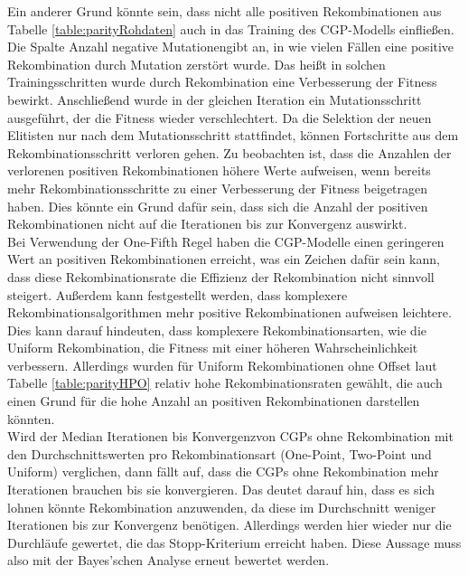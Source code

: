 Ein anderer Grund könnte sein, dass nicht alle positiven Rekombinationen aus Tabelle \ref{table:parityRohdaten} auch in das Training des CGP-Modells einfließen. 
Die Spalte \glqq Anzahl negative Mutationen\grqq\space gibt an, in wie vielen Fällen eine positive Rekombination durch Mutation zerstört wurde.
Das heißt in solchen Trainingsschritten wurde durch Rekombination eine Verbesserung der Fitness bewirkt.
Anschließend wurde in der gleichen Iteration ein Mutationsschritt ausgeführt, der die Fitness wieder verschlechtert.
Da die Selektion der neuen Elitisten nur nach dem Mutationsschritt stattfindet, können Fortschritte aus dem Rekombinationsschritt verloren gehen.
Zu beobachten ist, dass die Anzahlen der verlorenen positiven Rekombinationen höhere Werte aufweisen, wenn bereits mehr Rekombinationsschritte zu einer Verbesserung der Fitness beigetragen haben.
Dies könnte ein Grund dafür sein, dass sich die Anzahl der positiven Rekombinationen nicht auf die Iterationen bis zur Konvergenz auswirkt.\\
Bei Verwendung der One-Fifth Regel haben die CGP-Modelle einen geringeren Wert an positiven Rekombinationen erreicht, was ein Zeichen dafür sein kann, dass diese Rekombinationsrate die Effizienz der Rekombination nicht sinnvoll steigert.
Außerdem kann festgestellt werden, dass komplexere Rekombinationsalgorithmen mehr positive Rekombinationen aufweisen leichtere.
Dies kann darauf hindeuten, dass komplexere Rekombinationsarten, wie die Uniform Rekombination, die Fitness mit einer höheren Wahrscheinlichkeit verbessern.
Allerdings wurden für Uniform Rekombinationen ohne Offset laut Tabelle \ref{table:parityHPO} relativ hohe Rekombinationsraten gewählt, die auch einen Grund für die hohe Anzahl an positiven Rekombinationen darstellen könnten.\\
Wird der \glqq Median Iterationen bis Konvergenz\grqq\space von CGPs ohne Rekombination mit den Durchschnittswerten pro Rekombinationsart (One-Point, Two-Point und Uniform) verglichen, dann fällt auf, dass die CGPs ohne Rekombination mehr Iterationen brauchen bis sie konvergieren.
Das deutet darauf hin, dass es sich lohnen könnte Rekombination anzuwenden, da diese im Durchschnitt weniger Iterationen bis zur Konvergenz benötigen.
Allerdings werden hier wieder nur die Durchläufe gewertet, die das Stopp-Kriterium erreicht haben.
Diese Aussage muss also mit der Bayes'schen Analyse erneut bewertet werden.
